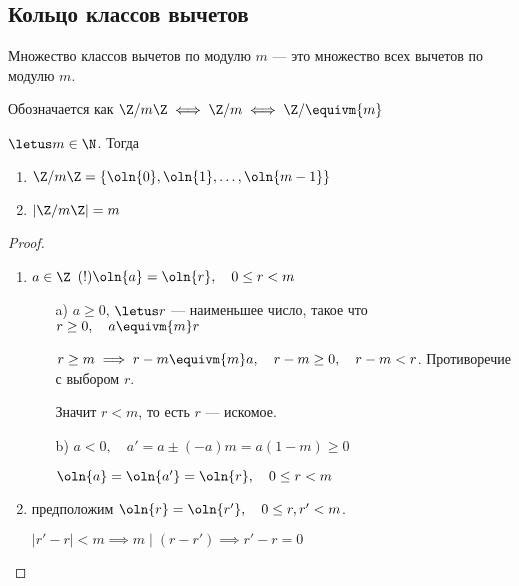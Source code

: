 \subsection{Кольцо классов вычетов}

\begin{defn}
    Множество классов вычетов по модулю $m$ --- это множество всех вычетов по модулю $m$.

    Обозначается как $\Z/m\Z \iff \Z/m \iff \Z/\equivm{m}$
\end{defn}

\begin{theorem}

    $\letus m \in \N$. Тогда 
    
    \begin{enumerate}
        \item $\Z/m\Z = \{\oln{0}, \oln{1}, \ldots, \oln{m-1}\}$
        \item $|\Z/m\Z| = m$ 
    \end{enumerate}
\end{theorem}

\begin{proof}

    \begin{enumerate}
        \item $a \in \Z$ $(!) \oln{a} = \oln{r}, \quad 0 \leq r < m$
        \begin{enumerate}
            \item[a)] $a \geq 0$, $\letus r$ --- наименьшее число, такое что $r \geq 0, \quad a \equivm{m} r$
            
            $r \geq m \implies r - m \equivm{m} a, \quad r - m \geq 0, \quad r - m < r$. Противоречие с выбором $r$.
            
            Значит $r < m$, то есть $r$ --- искомое.
            
            \item[b)] $a < 0, \quad a' = a \pm (-a)m = a(1-m) \geq 0$
            
            $\oln{a} = \oln{a'} = \oln{r}, \quad 0 \leq r < m$
        \end{enumerate}
        
        \item предположим $\oln{r} = \oln{r'}, \quad 0 \leq r, r' < m$.
        
        $|r' - r| < m \implies m \mid (r - r') \implies r' - r = 0$
    \end{enumerate}
\end{proof}


